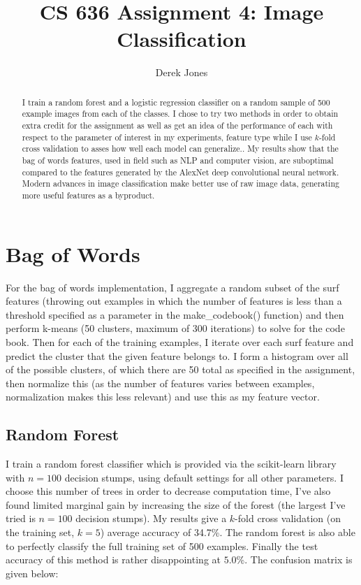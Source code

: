 \documentclass[]{article}
\title{CS 636 Assignment 4: Image Classification}
\author{Derek Jones}
\begin{document}
\maketitle

\begin{abstract}
	I train a random forest and a logistic regression classifier on a random sample of 500 example images from each of the classes. I chose to try two methods in order to obtain extra credit for the assignment as well as get an idea of the performance of each with respect to the parameter of interest in my experiments, feature type while I use $k$-fold cross validation to asses how well each model can generalize.. My results show that the bag of words features, used in field such as NLP and computer vision, are suboptimal compared to the features generated by the AlexNet deep convolutional neural network. Modern advances in image classification make better use of raw image data, generating more useful features as a byproduct. 
\end{abstract}


\section{Bag of Words}

For the bag of words implementation, I aggregate a random subset of the surf features (throwing out examples in which the number of features is less than a threshold specified as a parameter in the make\_codebook() function) and then perform k-means (50 clusters, maximum of 300 iterations) to solve for the code book. Then for each of the training examples, I iterate over each surf feature and predict the cluster that the given feature belongs to. I form a histogram over all of the possible clusters, of which there are 50 total as specified in the assignment, then normalize this (as the number of features varies between examples, normalization makes this less relevant) and use this as my feature vector.

\subsection{Random Forest}

 I train a random forest classifier which is provided via the scikit-learn library with $n = 100$ decision stumps, using default settings for all other parameters. I choose this number of trees in order to decrease computation time, I've also found limited marginal gain by increasing the size of the forest (the largest I've tried is $n=100$ decision stumps). My results give a $k$-fold cross validation (on the training set, $k = 5$) average accuracy of 34.7\%. The random forest is also able to perfectly classify the full training set of 500 examples. Finally the test accuracy of this method is rather disappointing at $5.0$\%. The confusion matrix is given below:
\end{document}
